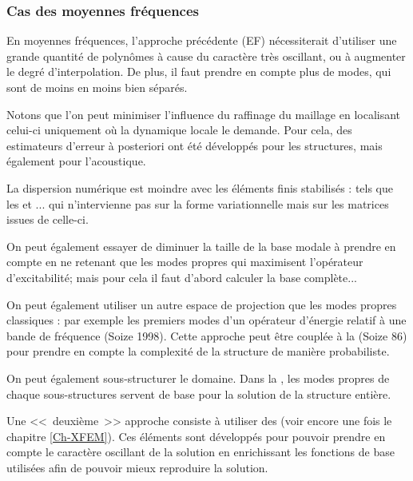 \medskip
\subsubsection{Cas des moyennes fréquences}
En moyennes fréquences, l'approche précédente (EF) nécessiterait d'utiliser une grande quantité de polynômes
à cause du caractère très oscillant, ou à augmenter le degré d'interpolation. De plus, il faut
prendre en compte plus de modes, qui sont de moins en moins bien séparés.

\medskip
Notons que l'on peut minimiser l'influence du raffinage du maillage en localisant celui-ci uniquement
où la dynamique locale le demande. Pour cela, des estimateurs d'erreur à posteriori ont été
développés pour les structures, mais également pour l'acoustique.

La dispersion numérique est moindre avec les éléments finis stabilisés :  tels que les  et ...
qui n'intervienne pas sur la forme variationnelle mais sur les matrices issues de celle-ci.

\medskip
On peut également essayer de diminuer la taille de la base modale à prendre en compte en
ne retenant que les modes propres qui maximisent l'opérateur d'excitabilité; mais pour cela
il faut d'abord calculer la base complète...

On peut également utiliser un autre espace de projection que les modes propres classiques :
par exemple les premiers modes d'un opérateur d'énergie relatif à une bande de fréquence
(Soize 1998).
Cette approche peut être couplée à la 
(Soize 86)  pour prendre en compte la complexité de la structure de manière probabiliste.

\medskip
On peut également sous-structurer le domaine.
Dans la , les
modes propres de chaque sous-structures  servent de base pour la solution
de la structure entière.

\bigskip
Une <<~deuxième~>> approche consiste à utiliser des 
(voir encore une fois le chapitre \ref{Ch-XFEM}).
Ces éléments sont développés pour pouvoir prendre en compte le caractère
oscillant de la solution  en enrichissant les fonctions de base utilisées afin de pouvoir
mieux reproduire la solution.

